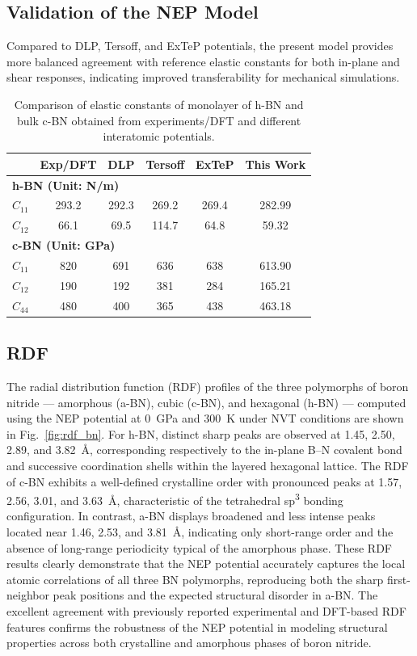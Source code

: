 \documentclass[review, 12pt]{elsarticle}
\numberwithin{equation}{section}
\begin{document}
\subsection{Validation of the NEP Model}

Compared to DLP, Tersoff, and ExTeP potentials, the present model provides more balanced agreement with reference elastic constants for both in-plane and shear responses, indicating improved transferability for mechanical simulations.


\begin{table}[htb!]
\centering
\caption{Comparison of elastic constants of monolayer of h-BN and bulk c-BN obtained from experiments/DFT and different interatomic potentials.}
\label{tab:elastic_bn}
\renewcommand{\arraystretch}{1.2}
\begin{tabular}{lccccc}
\toprule
 & Exp/DFT & DLP & Tersoff & ExTeP & This Work \\
\midrule
\multicolumn{6}{l}{\textbf{h-BN (Unit: N/m)}} \\
$C_{11}$ & 293.2 & 292.3 & 269.2 & 269.4 & 282.99 \\
$C_{12}$ & 66.1  & 69.5  & 114.7 & 64.8  & 59.32  \\
\midrule
\multicolumn{6}{l}{\textbf{c-BN (Unit: GPa)}} \\
$C_{11}$ & 820 & 691 & 636 & 638 & 613.90 \\
$C_{12}$ & 190 & 192 & 381 & 284 & 165.21 \\
$C_{44}$ & 480 & 400 & 365 & 438 & 463.18 \\
\bottomrule
\end{tabular}
\end{table}

\subsection{RDF}

The radial distribution function (RDF) profiles of the three polymorphs of boron nitride —
amorphous (a-BN), cubic (c-BN), and hexagonal (h-BN) — computed using the NEP potential 
at 0~GPa and 300~K under NVT conditions are shown in Fig.~\ref{fig:rdf_bn}. 
For h-BN, distinct sharp peaks are observed at 1.45, 2.50, 2.89, and 3.82~\AA, 
corresponding respectively to the in-plane B–N covalent bond and successive coordination 
shells within the layered hexagonal lattice. The RDF of c-BN exhibits a well-defined crystalline 
order with pronounced peaks at 1.57, 2.56, 3.01, and 3.63~\AA, characteristic of the tetrahedral 
sp\textsuperscript{3} bonding configuration. In contrast, a-BN displays broadened and less intense 
peaks located near 1.46, 2.53, and 3.81~\AA, indicating only short-range order and the absence 
of long-range periodicity typical of the amorphous phase. These RDF results clearly demonstrate 
that the NEP potential accurately captures the local atomic correlations of all three BN 
polymorphs, reproducing both the sharp first-neighbor peak positions and the expected 
structural disorder in a-BN. The excellent agreement with previously reported experimental 
and DFT-based RDF features confirms the robustness of the NEP potential in modeling 
structural properties across both crystalline and amorphous phases of boron nitride.
\end{document}
